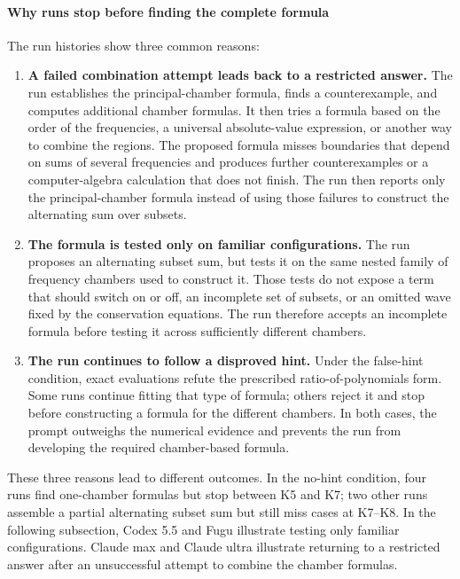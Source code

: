 \documentclass{article}
\begin{document}
\paragraph{Why runs stop before finding the complete formula}

The run histories show three common reasons:

\begin{enumerate}
    \item \textbf{A failed combination attempt leads back to a restricted answer.}
    The run establishes the principal-chamber formula, finds a counterexample, and
    computes additional chamber formulas. It then tries a formula based on the
    order of the frequencies, a universal absolute-value expression, or another
    way to combine the regions. The proposed formula misses boundaries that
    depend on sums of several frequencies and produces further
    counterexamples or a computer-algebra calculation that does not finish. The run then reports only
    the principal-chamber formula instead of using those failures to construct
    the alternating sum over subsets.

    \item \textbf{The formula is tested only on familiar configurations.}
    The run proposes an alternating subset sum, but tests it on
    the same nested family of frequency chambers used to construct it.
    Those tests do not expose a term that should switch on or off, an incomplete
    set of subsets, or an omitted wave fixed by the conservation equations. The run therefore accepts an
    incomplete formula before testing it across sufficiently different chambers.

    \item \textbf{The run continues to follow a disproved hint.}
    Under the false-hint condition, exact evaluations refute the prescribed
    ratio-of-polynomials form. Some runs continue fitting that type of formula;
    others reject it and stop before constructing a formula for the different chambers.
    In both cases, the prompt outweighs the numerical evidence and prevents the
    run from developing the required chamber-based formula.
\end{enumerate}

These three reasons lead to different outcomes. In the no-hint
condition, four runs find one-chamber formulas but stop between K5 and K7; two
other runs assemble a partial alternating subset sum but still miss cases
at K7--K8. In the following subsection,
Codex 5.5 and Fugu illustrate testing only familiar configurations. Claude max
and Claude ultra illustrate returning to a restricted answer after an
unsuccessful attempt to combine the chamber formulas.
\end{document}
